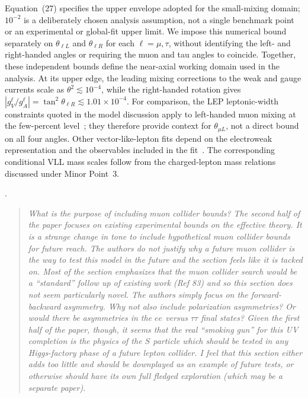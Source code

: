 \documentclass[12pt,a4paper]{article}
\begin{document}
Equation~(27) specifies the upper envelope adopted for the small-mixing domain; \(10^{-2}\) is a deliberately chosen analysis assumption, not a single benchmark point or an experimental or global-fit upper limit. We impose this numerical bound separately on \(\theta_{\ell L}\) and \(\theta_{\ell R}\) for each \(\ell=\mu,\tau\), without identifying the left- and right-handed angles or requiring the muon and tau angles to coincide. Together, these independent bounds define the near-axial working domain used in the analysis. At its upper edge, the leading mixing corrections to the weak and gauge currents scale as \(\theta^2\lesssim10^{-4}\), while the right-handed rotation gives \(|g_V^\ell/g_A^\ell|=\tan^2\theta_{\ell R}\lesssim1.01\times10^{-4}\). For comparison, the LEP leptonic-width constraints quoted in the model discussion apply to left-handed muon mixing at the few-percent level~\cite{ParticleDataGroup:2024cfk,ALEPH:2005ab}; they therefore provide context for \(\theta_{\mu L}\), not a direct bound on all four angles. Other vector-like-lepton fits depend on the electroweak representation and the observables included in the fit~\cite{Crivellin:2020ebi,Poh:2017tfo}. The corresponding conditional VLL mass scales follow from the charged-lepton mass relations discussed under Minor Point~3.

\medskip
{}.
\begin{quote}\itshape
What is the purpose of including muon collider bounds? The second half of the paper focuses on existing experimental bounds on the effective theory. It is a strange change in tone to include hypothetical muon collider bounds for future reach. The authors do not justify why a future muon collider is the way to test this model in the future and the section feels like it is tacked on. Most of the section emphasizes that the muon collider search would be a ``standard'' follow up of existing work (Ref 83) and so this section does not seem particularly novel. The authors simply focus on the forward-backward asymmetry. Why not also include polarization asymmetries? Or would there be asymmetries in the \(ee\) versus \(\tau\tau\) final states? Given the first half of the paper, though, it seems that the real ``smoking gun'' for this UV completion is the physics of the \(S\) particle which should be tested in any Higgs-factory phase of a future lepton collider. I feel that this section either adds too little and should be downplayed as an example of future tests, or otherwise should have its own full fledged exploration (which may be a separate paper).
\end{quote}
\end{document}
